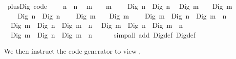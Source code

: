 \begin{isabellebody}
\begin{isamarkuptext}
\end{isamarkuptext}%
\isamarkuptrue%
%
\isadelimquoteme
%
\endisadelimquoteme
%
\isatagquoteme
{}\isamarkupfalse%
\ plus{\isacharunderscore}Dig\ {\isacharbrackleft}code{\isacharbrackright}{\isacharcolon}\isanewline
\ \ {\isachardoublequoteopen}{}\ {\isacharplus}\ n\ {\isacharequal}\ n{\isachardoublequoteclose}\isanewline
\ \ {\isachardoublequoteopen}m\ {\isacharplus}\ {}\ {\isacharequal}\ m{\isachardoublequoteclose}\isanewline
\ \ {\isachardoublequoteopen}{}\ {\isacharplus}\ Dig{}\ n\ {\isacharequal}\ Dig{}\ n{\isachardoublequoteclose}\isanewline
\ \ {\isachardoublequoteopen}Dig{}\ m\ {\isacharplus}\ {}\ {\isacharequal}\ Dig{}\ m{\isachardoublequoteclose}\isanewline
\ \ {\isachardoublequoteopen}{}\ {\isacharplus}\ Dig{}\ n\ {\isacharequal}\ Dig{}\ {\isacharparenleft}n\ {\isacharplus}\ {}{\isacharparenright}{\isachardoublequoteclose}\isanewline
\ \ {\isachardoublequoteopen}Dig{}\ m\ {\isacharplus}\ {}\ {\isacharequal}\ Dig{}\ {\isacharparenleft}m\ {\isacharplus}\ {}{\isacharparenright}{\isachardoublequoteclose}\isanewline
\ \ {\isachardoublequoteopen}Dig{}\ m\ {\isacharplus}\ Dig{}\ n\ {\isacharequal}\ Dig{}\ {\isacharparenleft}m\ {\isacharplus}\ n{\isacharparenright}{\isachardoublequoteclose}\isanewline
\ \ {\isachardoublequoteopen}Dig{}\ m\ {\isacharplus}\ Dig{}\ n\ {\isacharequal}\ Dig{}\ {\isacharparenleft}m\ {\isacharplus}\ n{\isacharparenright}{\isachardoublequoteclose}\isanewline
\ \ {\isachardoublequoteopen}Dig{}\ m\ {\isacharplus}\ Dig{}\ n\ {\isacharequal}\ Dig{}\ {\isacharparenleft}m\ {\isacharplus}\ n{\isacharparenright}{\isachardoublequoteclose}\isanewline
\ \ {\isachardoublequoteopen}Dig{}\ m\ {\isacharplus}\ Dig{}\ n\ {\isacharequal}\ Dig{}\ {\isacharparenleft}m\ {\isacharplus}\ n\ {\isacharplus}\ {}{\isacharparenright}{\isachardoublequoteclose}\isanewline
\ \ \isamarkupfalse%
\ {\isacharparenleft}simp{\isacharunderscore}all\ add{\isacharcolon}\ Dig{}{\isacharunderscore}def\ Dig{}{\isacharunderscore}def{\isacharparenright}%
\endisatagquoteme
{\isafoldquoteme}%
%
\isadelimquoteme
%
\endisadelimquoteme
%
\begin{isamarkuptext}%
\noindent We then instruct the code generator to view ,

\end{isamarkuptext}
\end{isabellebody}

